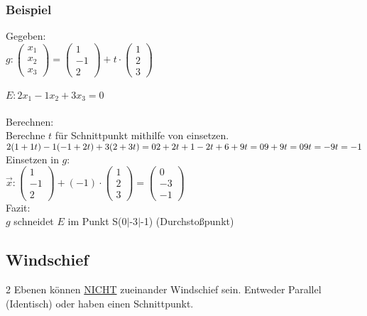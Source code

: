 \subsubsection{Beispiel}
Gegeben: \\
$
g:
\begin{pmatrix}
    x_1 \\ x_2 \\ x_3
\end{pmatrix}
=
\begin{pmatrix}
    1 \\ -1 \\ 2
\end{pmatrix}
+ t \cdot
\begin{pmatrix}
    1 \\ 2 \\ 3
\end{pmatrix}
$
\\\\
$
E: 2x_1 - 1x_2 + 3x_3 = 0
$
\\\\ 
Berechnen: \\
Berechne $t$ für Schnittpunkt mithilfe von einsetzen. \\
$
2(1 + 1t) - 1(-1 + 2t) + 3(2 + 3t) = 0 \\
2 + 2t + 1 - 2t + 6 + 9t = 0 \\
9 + 9t = 0 \\
9t = -9 \\
t = -1 \\
$
Einsetzen in $g$: \\
$
\vec{x}:
\begin{pmatrix}
    1 \\ -1 \\ 2 
\end{pmatrix}
+ 
(-1)
\cdot
\begin{pmatrix}
    1 \\ 2 \\ 3
\end{pmatrix}
= 
\begin{pmatrix}
    0 \\ -3 \\ -1
\end{pmatrix}
$ \\
Fazit: \\
$g$ schneidet $E$ im Punkt S(0$|$-3$|$-1) (Durchstoßpunkt)

\subsection{Windschief}
2 Ebenen können \underline{NICHT} zueinander Windschief sein.
Entweder Parallel (Identisch) oder haben einen Schnittpunkt.

